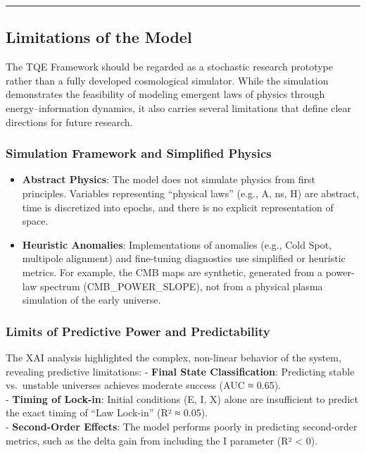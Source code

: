 \begin{center}\rule{0.5\linewidth}{0.5pt}\end{center}

\subsection{Limitations of the Model}\label{limitations-of-the-model}

The TQE Framework should be regarded as a stochastic research prototype
rather than a fully developed cosmological simulator. While the
simulation demonstrates the feasibility of modeling emergent laws of
physics through energy--information dynamics, it also carries several
limitations that define clear directions for future research.

\subsubsection{Simulation Framework and Simplified
Physics}\label{simulation-framework-and-simplified-physics}

\begin{itemize}
\tightlist
\item
  \textbf{Abstract Physics}: The model does not simulate physics from
  first principles. Variables representing ``physical laws'' (e.g., A,
  ns, H) are abstract, time is discretized into epochs, and there is no
  explicit representation of space.\\
\item
  \textbf{Heuristic Anomalies}: Implementations of anomalies (e.g., Cold
  Spot, multipole alignment) and fine-tuning diagnostics use simplified
  or heuristic metrics. For example, the CMB maps are synthetic,
  generated from a power-law spectrum (CMB\_POWER\_SLOPE), not from a
  physical plasma simulation of the early universe.
\end{itemize}

\subsubsection{Limits of Predictive Power and
Predictability}\label{limits-of-predictive-power-and-predictability}

The XAI analysis highlighted the complex, non-linear behavior of the
system, revealing predictive limitations: - \textbf{Final State
Classification}: Predicting stable vs.~unstable universes achieves
moderate success (AUC ≈ 0.65).\\
- \textbf{Timing of Lock-in}: Initial conditions (E, I, X) alone are
insufficient to predict the exact timing of ``Law Lock-in'' (R² ≈
0.05).\\
- \textbf{Second-Order Effects}: The model performs poorly in predicting
second-order metrics, such as the delta gain from including the I
parameter (R² \textless{} 0).

